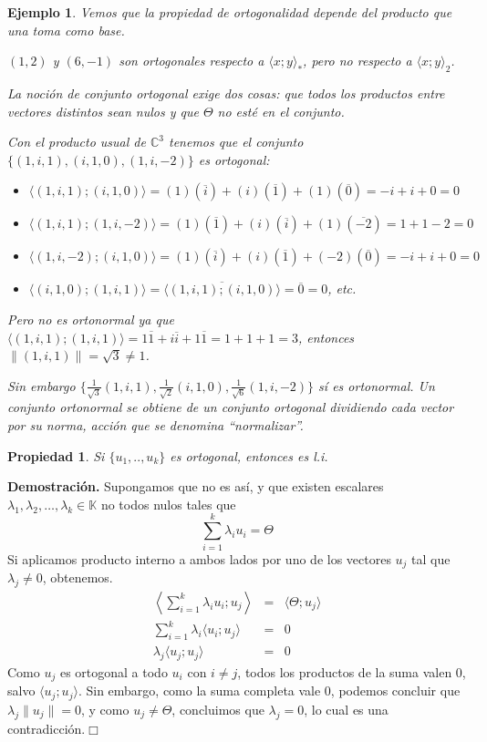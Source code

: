 \documentclass[12pt]{book}
\newtheorem{prop}{Propiedad}
\newtheorem{ejem}{Ejemplo}
\def\C{\mathbb{C}}
\def\K{\mathbb{K}}
\begin{document}
{\begin{ejem}
{    Vemos que la propiedad de ortogonalidad depende del producto que una toma como base.

    $(1,2)$ y $(6,-1)$ son ortogonales respecto a $\langle x;y\rangle_*$, pero no respecto a $\langle x;y\rangle_2$.

    La noción de conjunto ortogonal exige dos cosas: que todos los productos entre vectores distintos sean nulos y que $\Theta$ no esté en el conjunto.

    Con el producto usual de $\C^3$ tenemos que el conjunto $\{(1,i,1),(i,1,0), (1,i,-2)\}$ es ortogonal:

    \begin{itemize}
    \item $\langle (1,i,1);(i,1,0)\rangle=(1)(\overline{i})+(i)(\overline{1})+(1)(\overline{0})=-i+i+0=0$
    \item $\langle (1,i,1);(1,i,-2)\rangle=(1)(\overline{1})+(i)(\overline{i})+(1)(\overline{-2})=1+1-2=0$
    \item $\langle (1,i,-2);(i,1,0)\rangle=(1)(\overline{i})+(i)(\overline{1})+(-2)(\overline{0})=-i+i+0=0$
    \item $\langle (i,1,0);(1,i,1)\rangle=\overline{\langle(1,i,1);(i,1,0)\rangle}=\overline{0}=0$, etc.
    \end{itemize}

   Pero no es ortonormal ya que $\langle (1,i,1);(1,i,1)\rangle=1\overline{1}+i\overline{i}+1\overline{1}=1+1+1=3$, entonces $\|(1,i,1)\|=\sqrt{3}\not =1$.
    
  Sin embargo $\{\frac{1}{\sqrt{3}}(1,i,1),\frac{1}{\sqrt{2}}(i,1,0), \frac{1}{\sqrt{6}}(1,i,-2)\}$ sí es ortonormal. Un conjunto ortonormal se obtiene de un conjunto ortogonal dividiendo cada vector por su norma, acción que se denomina ``normalizar''.
}
\end{ejem}

\begin{prop}
Si $\{u_1,..,u_k\}$ es ortogonal, entonces es l.i.
\end{prop}
    {\bf Demostración.} {\small
      Supongamos que no es así, y que existen escalares $\lambda_1,\lambda_2,\dots,\lambda_k\in\K$ no todos nulos tales que
      $$\sum_{i=1}^k \lambda_i u_i=\Theta$$
      Si aplicamos producto interno a ambos lados por uno de los vectores $u_j$ tal que $\lambda_j\not=0$, obtenemos.
      \begin{eqnarray*}
        \left\langle\sum_{i=1}^k \lambda_i u_i;u_j\right\rangle&=&\langle\Theta;u_j\rangle\\
        \sum_{i=1}^k \lambda_i \langle u_i;u_j\rangle&=&0\\
        \lambda_j \langle u_j;u_j\rangle&=&0
      \end{eqnarray*}
      Como $u_j$ es ortogonal a todo $u_i$ con $i\not = j$, todos los productos de la suma valen 0, salvo $\langle u_j;u_j\rangle$.
      Sin embargo, como la suma completa vale 0, podemos concluir que $\lambda_j\|u_j\|=0$, y como $u_j\not=\Theta$, concluimos que $\lambda_j=0$, lo cual es una contradicción.\hfill $\Box$
    }

}
\end{document}
